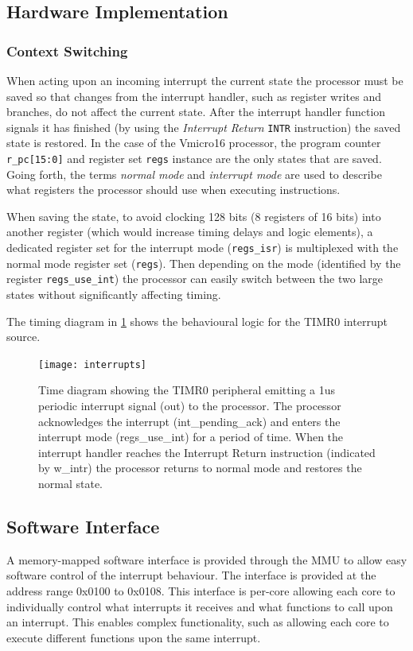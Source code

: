 \subsection{Hardware Implementation}

\subsubsection{Context Switching}
When acting upon an incoming interrupt the current state the processor must be saved so that changes from the interrupt handler, such as register writes and branches, do not affect the current state. After the interrupt handler function signals it has finished (by using the \textit{Interrupt Return} \verb|INTR| instruction) the saved state is restored.
In the case of the Vmicro16 processor, the program counter \verb|r_pc[15:0]| and register set \verb|regs| instance are the only states that are saved. Going forth, the terms \textit{normal mode} and \textit{interrupt mode} are used to describe what registers the processor should use when executing instructions.

When saving the state, to avoid clocking 128 bits (8 registers of 16 bits) into another register (which would increase timing delays and logic elements), a dedicated register set for the interrupt mode (\verb|regs_isr|) is multiplexed with the normal mode register set (\verb|regs|). Then depending on the mode (identified by the register \verb|regs_use_int|) the processor can easily switch between the two large states without significantly affecting timing.

The timing diagram in \cref{fig:interrupts} shows the behavioural logic for the TIMR0 interrupt source.

\begin{figure}[H]
\centering
\texttt{[image: interrupts]}
\caption{Time diagram showing the TIMR0 peripheral emitting a 1us periodic interrupt signal (out) to the processor. The processor acknowledges the interrupt (int\_pending\_ack) and enters the interrupt mode (regs\_use\_int) for a period of time. When the interrupt handler reaches the Interrupt Return instruction (indicated by w\_intr) the processor returns to normal mode and restores the normal state.}
\label{fig:interrupts}
\end{figure}

\subsection{Software Interface}
A memory-mapped software interface is provided through the MMU to allow easy software control of the interrupt behaviour. The interface is provided at the address range 0x0100 to 0x0108. This interface is per-core allowing each core to individually control what interrupts it receives and what functions to call upon an interrupt. This enables complex functionality, such as allowing each core to execute different functions upon the same interrupt.

